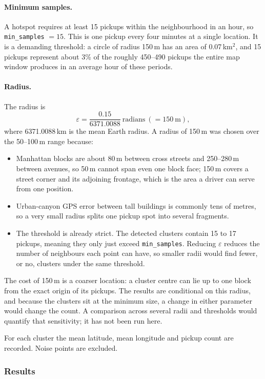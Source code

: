 \documentclass[11pt,a4paper]{article}
\begin{document}
\paragraph{Minimum samples.} A hotspot requires at least 15 pickups within the neighbourhood in an hour, so \texttt{min\_samples} $=15$. This is one pickup every four minutes at a single location. It is a demanding threshold: a circle of radius 150\,m has an area of 0.07\,km$^2$, and 15 pickups represent about 3\% of the roughly 450--490 pickups the entire map window produces in an average hour of these periods.

\paragraph{Radius.} The radius is
\[
\varepsilon = \frac{0.15}{6371.0088}\ \text{radians}\ (= 150\ \text{m}),
\]
where 6371.0088\,km is the mean Earth radius. A radius of 150\,m was chosen over the 50--100\,m range because:
\begin{itemize}
    \item Manhattan blocks are about 80\,m between cross streets and 250--280\,m between avenues, so 50\,m cannot span even one block face; 150\,m covers a street corner and its adjoining frontage, which is the area a driver can serve from one position.
    \item Urban-canyon GPS error between tall buildings is commonly tens of metres, so a very small radius splits one pickup spot into several fragments.
    \item The threshold is already strict. The detected clusters contain 15 to 17 pickups, meaning they only just exceed \texttt{min\_samples}. Reducing $\varepsilon$ reduces the number of neighbours each point can have, so smaller radii would find fewer, or no, clusters under the same threshold.
\end{itemize}
The cost of 150\,m is a coarser location: a cluster centre can lie up to one block from the exact origin of its pickups. The results are conditional on this radius, and because the clusters sit at the minimum size, a change in either parameter would change the count. A comparison across several radii and thresholds would quantify that sensitivity; it has not been run here.

For each cluster the mean latitude, mean longitude and pickup count are recorded. Noise points are excluded.

\subsubsection{Results}
\end{document}
